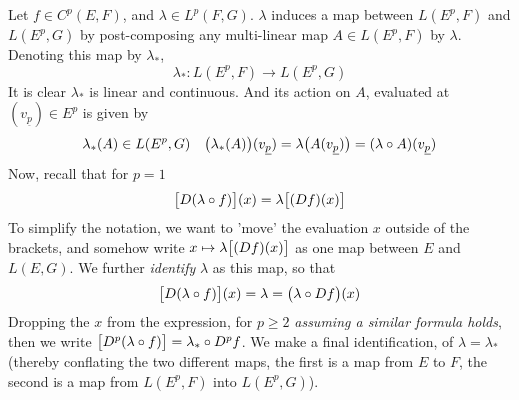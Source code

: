 \documentclass[../main-manifolds.tex]{subfiles}
\begin{document}
\begin{note}
    Let $f\in C^p(E,F)$, and $\lambda\in L^p(F,G)$. $\lambda$ induces a map between $L(E^p, F)$ and $L(E^p, G)$ by post-composing any multi-linear map $A\in L(E^p, F)$ by $\lambda$. Denoting this map by $\lambda_*$, 
\[
\lambda_*: L(E^p, F)\to L(E^p, G)
\]
It is clear $\lambda_*$ is linear and continuous. And its action on $A$, evaluated at $(v_{\underline{p}})\in E^p$ is given by
\[
    \lambda_*(A)\in L(E^p, G)\quad \qty\big(\lambda_*(A))(v_{\underline{p}}) = \lambda\qty\big(A(v_{\underline{p}})) = (\lambda\circ A)(v_{\underline{p}})
\]
Now, recall that for $p=1$
\[
    \qty\big[D(\lambda\circ f)](x) = \lambda\qty\big[(Df)(x)]
\]
To simplify the notation, we want to 'move' the evaluation $x$ outside of the brackets, and somehow write $x\mapsto \lambda\qty\big[(Df)(x)]$ as one map between $E$ and $L(E,G)$. We further \emph{identify} $\lambda$ as this map, so that
\[
    \qty\big[D(\lambda\circ f)](x) = \lambda  = \qty\big(\lambda \circ Df)(x)
\]
Dropping the $x$ from the expression, for $p\geq 2$ \emph{assuming a similar formula holds}, then we write $\qty\big[D^p(\lambda\circ f)] = \lambda_*\circ D^pf$. We make a final identification, of $\lambda = \lambda_*$ (thereby conflating the two different maps, the first is a map from $E$ to $F$, the second is a map from $L(E^p, F)$ into $L(E^p, G)$).
\end{note}
\end{document}
